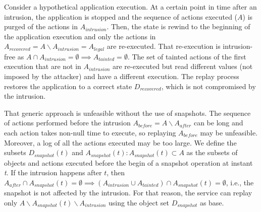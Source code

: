 Consider a hypothetical application execution. At a certain point in time after an intrusion, the application is stopped and the sequence of actions executed ($A$) is purged of the actions in $A_{intrusion}$.
%
Then, the state is rewind to the beginning of the application execution and only the actions in $A_{recovered} = A \backslash A_{intrusion} = A_{legal}$ are re-executed. That re-execution is intrusion-free as 
$A \cap A_{intrusion} = \emptyset \implies A_{tainted} = \emptyset$. 
The set of tainted actions of the first execution that are not in $A_{intrusion}$ are re-executed but read different values (not imposed by the attacker) and have a different execution. 
The replay process restores the application to a correct state $D_{recovered}$, which is not compromised by the intrusion.

That generic approach is unfeasible without the use of snapshots.
The sequence of actions performed before the intrusion $A_{before} = A \backslash A_{after}$ can be long and each action takes non-null time to execute, so replaying $A_{before}$ may be unfeasible. Moreover, a log of all the actions executed may be too large.
We define the subsets $D_{snapshot}(t)$ and $A_{snapshot}(t) : A_{snapshot}(t) \subset A$ as the subsets of objects and actions executed before the begin of a snapshot operation at instant \textit{t}. 
If the intrusion happens after $t$, then $A_{after} \cap A_{snapshot}(t) = \emptyset \implies (A_{intrusion} \cup A_{tainted}) \cap A_{snapshot}(t) = \emptyset$, i.e., the snapshot is not affected by the intrusion. For that reason, the service can replay only $A \backslash A_{snapshot}(t) \backslash A_{intrusion}$ using the object set $D_{snapshot}$ as base. 

